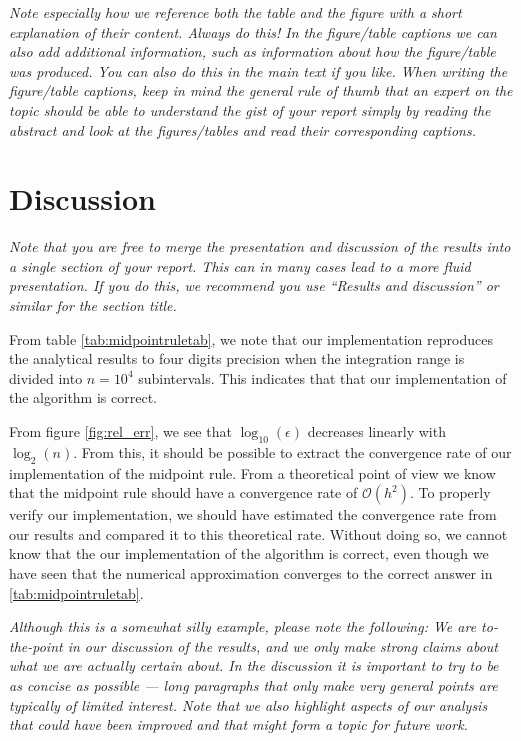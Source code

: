 \documentclass[english,notitlepage,reprint,nofootinbib]{revtex4-1}  %
\begin{document}
	\textit{Note especially how we reference both the table and the figure with a short explanation of their content. Always do this! In the figure/table captions we can also add additional information, such as information about how the figure/table was produced. You can also do this in the main text if you like. When writing the figure/table captions, keep in mind the general rule of thumb that an expert on the topic should be able to understand the gist of your report simply by reading the abstract and look at the figures/tables and read their corresponding captions.}
	
	
	\section{Discussion}\label{sec:discussion}
	\textit{Note that you are free to merge the presentation and discussion of the results into a single section of your report. This can in many cases lead to a more fluid presentation. If you do this, we recommend you use ``Results and discussion'' or similar for the section title.}
	
	From table \ref{tab:midpointruletab}, we note that our implementation reproduces the analytical results to four digits precision when the integration range is divided into $n = 10^4$ subintervals. This indicates that that our implementation of the algorithm is correct.
	
	From figure \ref{fig:rel_err}, we see that $\log_{10}(\epsilon)$ decreases linearly with $\log_{2}(n)$. From this, it should be possible to extract the convergence rate of our implementation of the midpoint rule. From a theoretical point of view we know that the midpoint rule should have a convergence rate of $\mathcal{O}(h^2)$. To properly verify our implementation, we should have estimated the convergence rate from our results and compared it to this theoretical rate. Without doing so, we cannot know that the our implementation of the algorithm is correct, even though we have seen that the numerical approximation converges to the correct answer in \ref{tab:midpointruletab}.
	
	\textit{Although this is a somewhat silly example, please note the following: We are to-the-point in our discussion of the results, and we only make strong claims about what we are actually certain about. In the discussion it is important to try to be as concise as possible --- long paragraphs that only make very general points are typically of limited interest. Note that we also highlight aspects of our analysis that could have been improved and that might form a topic for future work.}
	
\end{document}
